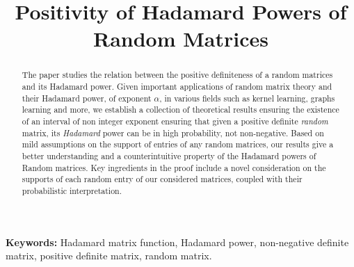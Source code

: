 \documentclass[conference,letterpaper]{IEEEtran}
\numberwithin{equation}{section}
\begin{document}
\title{Positivity of Hadamard Powers of Random Matrices}


\author{%
  \and
}



\maketitle


\begin{abstract}
\noindent The paper studies the relation between the positive definiteness of a random matrices and its Hadamard power.
Given important applications of random matrix theory and their Hadamard power, of exponent $\alpha$, in various fields such as kernel learning, graphs learning and more, we establish a collection of theoretical results ensuring the existence of an interval of non integer exponent ensuring that given a positive definite \emph{random} matrix, its \emph{Hadamard} power can be in high probability, not non-negative.
Based on mild assumptions on the support of entries of any random matrices, our results give a better understanding and a counterintuitive property of the Hadamard powers of Random matrices.
Key ingredients in the proof include a novel consideration on the supports of each random entry of our considered matrices, coupled with their probabilistic interpretation.
\end{abstract}



\noindent\textbf{Keywords:} Hadamard matrix function, Hadamard power, non-negative definite matrix, positive definite matrix, random matrix.
\end{document}
